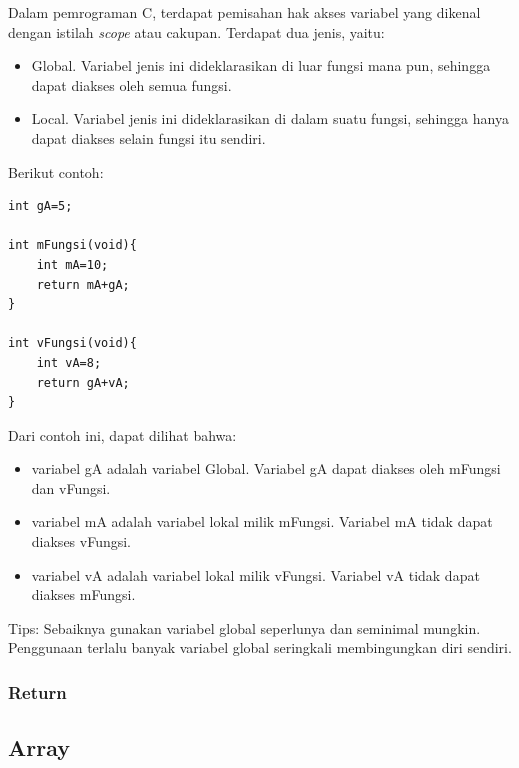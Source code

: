 \documentclass[12pt,]{article}
\begin{document}
	Dalam pemrograman C, terdapat pemisahan hak akses variabel yang dikenal dengan istilah \textit{scope} atau cakupan.
	Terdapat dua jenis, yaitu:
	\begin{itemize}
		\item Global. Variabel jenis ini dideklarasikan di luar fungsi mana pun, sehingga dapat diakses oleh semua fungsi.
		\item Local. Variabel jenis ini dideklarasikan di dalam suatu fungsi, sehingga hanya dapat diakses selain fungsi itu sendiri.
	\end{itemize}
	 Berikut contoh:
	 \begin{verbatim}
int gA=5;

int mFungsi(void){
	int mA=10;
	return mA+gA;
}

int vFungsi(void){
	int vA=8;
	return gA+vA;
}
	 \end{verbatim}
	 
	 Dari contoh ini, dapat dilihat bahwa:
	 \begin{itemize}
	 	\item variabel gA adalah variabel Global.
	 	Variabel gA dapat diakses oleh mFungsi dan vFungsi.
	 	
	 	\item variabel mA adalah variabel lokal milik mFungsi.
	 	Variabel mA tidak dapat diakses vFungsi.
	 	
	 	\item variabel vA adalah variabel lokal milik vFungsi.
	 	Variabel vA tidak dapat diakses mFungsi.
	 \end{itemize}
 
 	Tips: Sebaiknya gunakan variabel global seperlunya dan seminimal mungkin.
 	Penggunaan terlalu banyak variabel global seringkali membingungkan diri sendiri.
 	
 	\subsubsection{Return}
	
	\newpage
	\subsection{Array}
	
\end{document}
